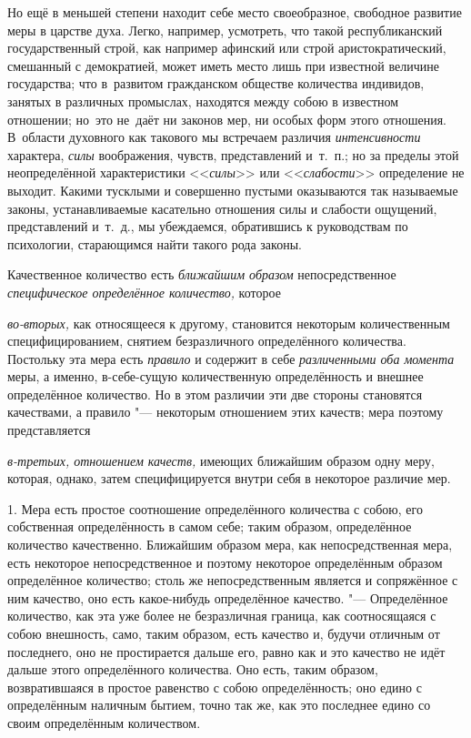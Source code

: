 Но ещё в меньшей степени находит себе место своеобразное, свободное развитие
меры в царстве духа. Легко, например, усмотреть, что такой республиканский
государственный строй, как например афинский или строй аристократический,
смешанный с демократией, может иметь место лишь при известной величине
государства; что в~развитом гражданском обществе количества индивидов, занятых
в различных промыслах, находятся между собою в известном отношении; но~это
не~даёт ни законов мер, ни особых форм этого отношения. В~области духовного
как такового мы встречаем различия {\em интенсивности} характера, {\em силы}
воображения, чувств, представлений и~т.~п.; но за пределы этой неопределённой
характеристики <<{\em силы}>> или <<{\em слабости}>> определение не выходит.
Какими тусклыми и совершенно пустыми оказываются так называемые законы,
устанавливаемые касательно отношения силы и слабости ощущений, представлений
и~т.~д., мы убеждаемся, обратившись к руководствам по психологии, старающимся
найти такого рода законы.


Качественное количество есть {\em ближайшим образом} непосредственное
{\em специфическое определённое количество,} которое

{\em во-вторых,} как относящееся к другому, становится некоторым количественным
специфицированием, снятием безразличного определённого количества. Постольку
эта мера есть {\em правило} и содержит в себе {\em различенными оба момента}
меры, а именно, в-себе-сущую количественную определённость и внешнее
определённое количество. Но в этом различии эти две стороны становятся
качествами, а правило "--- некоторым отношением этих качеств; мера поэтому
представляется

{\em в-третьих, отношением качеств,} имеющих ближайшим образом одну меру,
которая, однако, затем специфицируется внутри себя в некоторое различие мер.


1. Мера есть простое соотношение определённого количества с собою, его
собственная определённость в самом себе; таким образом, определённое количество
качественно. Ближайшим образом мера, как непосредственная мера, есть некоторое
непосредственное и поэтому некоторое определённым образом определённое
количество; столь же непосредственным является и сопряжённое с ним качество,
оно есть какое-нибудь определённое качество. "--- Определённое количество, как
эта уже более не безразличная граница, как соотносящаяся с собою внешность,
само, таким образом, есть качество и, будучи отличным от последнего, оно не
простирается дальше его, равно как и это качество не идёт дальше этого
определённого количества. Оно есть, таким образом, возвратившаяся в простое
равенство с собою определённость; оно едино с определённым наличным бытием,
точно так же, как это последнее едино со своим определённым количеством.

